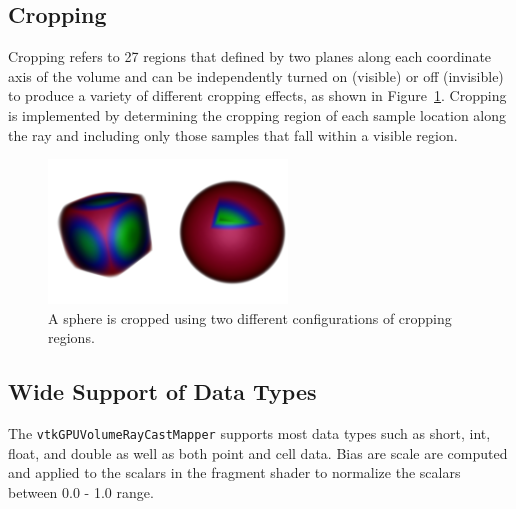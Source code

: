 \subsection{Cropping} Cropping refers to 27 regions that defined by two
planes along each coordinate axis of the volume and can be independently turned
on (visible) or off (invisible) to produce a variety of different cropping
effects, as shown in Figure~\ref{fig:cropping}. Cropping is implemented by
determining the cropping region of each sample location along the ray and
including only those samples that fall within a visible region.

\begin{figure}[ht]
  \centering
  \includegraphics[width=2.5in]{SphereCropping.png}
  \caption{A sphere is cropped using two different configurations of cropping regions.}
  \label{fig:cropping}
\end{figure}

\subsection{Wide Support of Data Types}
The \texttt{vtkGPUVolumeRayCastMapper} supports most data types such as short,
int, float, and double as well as both point and cell data. Bias are scale are
computed and applied to the scalars in the fragment shader to normalize the
scalars between 0.0 - 1.0 range. 

